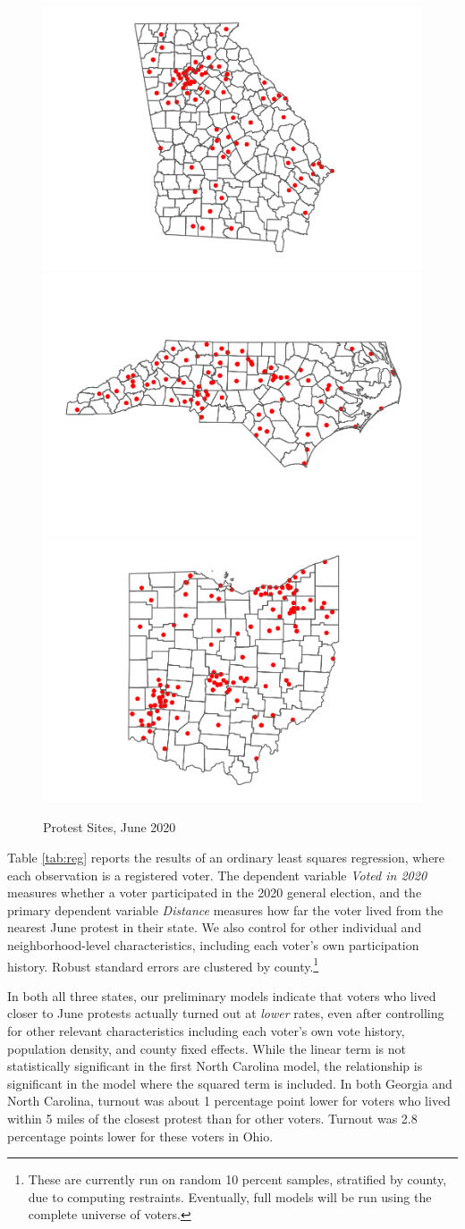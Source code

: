 \documentclass[
  12pt,
]{article}
\begin{document}
\begin{figure}[H]
\includegraphics[width=0.32\linewidth]{asa_abstract_files/figure-latex/figures-side-1} \includegraphics[width=0.32\linewidth]{asa_abstract_files/figure-latex/figures-side-2} \includegraphics[width=0.32\linewidth]{asa_abstract_files/figure-latex/figures-side-3} \caption{\label{fig:map}Protest Sites, June 2020}\label{fig:figures-side}
\end{figure}

Table \ref{tab:reg} reports the results of an ordinary least squares regression, where each observation is a registered voter. The dependent variable \emph{Voted in 2020} measures whether a voter participated in the 2020 general election, and the primary dependent variable \emph{Distance} measures how far the voter lived from the nearest June protest in their state. We also control for other individual and neighborhood-level characteristics, including each voter's own participation history. Robust standard errors are clustered by county.\footnote{These are currently run on random 10 percent samples, stratified by county, due to computing restraints. Eventually, full models will be run using the complete universe of voters.}

\begin{singlespace}

\end{singlespace}

In both all three states, our preliminary models indicate that voters who lived closer to June protests actually turned out at \emph{lower} rates, even after controlling for other relevant characteristics including each voter's own vote history, population density, and county fixed effects. While the linear term is not statistically significant in the first North Carolina model, the relationship is significant in the model where the squared term is included. In both Georgia and North Carolina, turnout was about 1 percentage point lower for voters who lived within 5 miles of the closest protest than for other voters. Turnout was 2.8 percentage points lower for these voters in Ohio.
\end{document}
